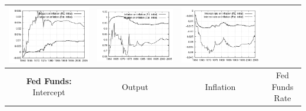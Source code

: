 \documentclass{beamer}
\begin{document}
{\begin{tabular}{|cccc|}
  \includegraphics[scale=0.17]{plots2/initest_Output_on_inflation.png} &
  \includegraphics[scale=0.17]{plots2/initest_Inflation_on_inflation.png} & 
  \includegraphics[scale=0.17]{plots2/initest_Interest_rate_on_inflation.png} \\ \hline
  \small{\textbf{Fed Funds:} Intercept} & \small{Output} & \small{Inflation} & \small{Fed Funds Rate} \\ \hline

\end{tabular}}
\end{document}
